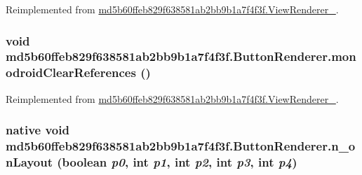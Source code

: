 Reimplemented from \hyperlink{classmd5b60ffeb829f638581ab2bb9b1a7f4f3f_1_1_view_renderer__2_64ca8244a89f60a47c173d9c0b15d610}{md5b60ffeb829f638581ab2bb9b1a7f4f3f.ViewRenderer\_}.\hypertarget{classmd5b60ffeb829f638581ab2bb9b1a7f4f3f_1_1_button_renderer_95654f418661c12f44eaabf4ec84d2d0}{
\subsubsection[{monodroidClearReferences}]{\setlength{\rightskip}{0pt plus 5cm}void md5b60ffeb829f638581ab2bb9b1a7f4f3f.ButtonRenderer.monodroidClearReferences ()}}
\label{classmd5b60ffeb829f638581ab2bb9b1a7f4f3f_1_1_button_renderer_95654f418661c12f44eaabf4ec84d2d0}




Reimplemented from \hyperlink{classmd5b60ffeb829f638581ab2bb9b1a7f4f3f_1_1_view_renderer__2_dae20979ac761a65aa60c9b427509c37}{md5b60ffeb829f638581ab2bb9b1a7f4f3f.ViewRenderer\_}.\hypertarget{classmd5b60ffeb829f638581ab2bb9b1a7f4f3f_1_1_button_renderer_3d85bf7ad5f9368589a177164ef752bd}{
\subsubsection[{n\_\-onLayout}]{\setlength{\rightskip}{0pt plus 5cm}native void md5b60ffeb829f638581ab2bb9b1a7f4f3f.ButtonRenderer.n\_\-onLayout (boolean {\em p0}, \/  int {\em p1}, \/  int {\em p2}, \/  int {\em p3}, \/  int {\em p4})}}
\label{classmd5b60ffeb829f638581ab2bb9b1a7f4f3f_1_1_button_renderer_3d85bf7ad5f9368589a177164ef752bd}




